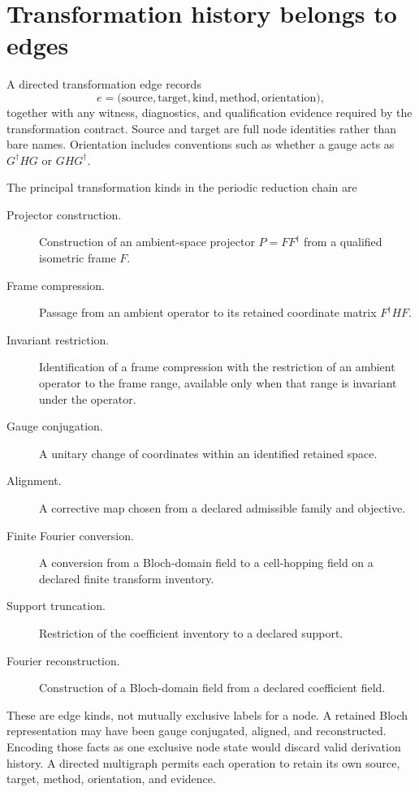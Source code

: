 \section{Transformation history belongs to edges}

A directed transformation edge records
\begin{equation}
  e=
  \bigl(
    \text{source},\text{target},\text{kind},
    \text{method},\text{orientation}
  \bigr),
  \label{eq:representation-carrier-edge-identity}
\end{equation}
together with any witness, diagnostics, and qualification evidence required by
the transformation contract. Source and target are full node identities rather
than bare names. Orientation includes conventions such as whether a gauge acts
as $G^\dagger H G$ or $G H G^\dagger$.

The principal transformation kinds in the periodic reduction chain are

\begin{description}
  \item[Projector construction.] Construction of an ambient-space projector
    $P=FF^\dagger$ from a qualified isometric frame $F$.
  \item[Frame compression.] Passage from an ambient operator to its retained
    coordinate matrix $F^\dagger H F$.
  \item[Invariant restriction.] Identification of a frame compression with the
    restriction of an ambient operator to the frame range, available only when
    that range is invariant under the operator.
  \item[Gauge conjugation.] A unitary change of coordinates within an identified
    retained space.
  \item[Alignment.] A corrective map chosen from a declared admissible family
    and objective.
  \item[Finite Fourier conversion.] A conversion from a Bloch-domain field to
    a cell-hopping field on a declared finite transform inventory.
  \item[Support truncation.] Restriction of the coefficient inventory to a
    declared support.
  \item[Fourier reconstruction.] Construction of a Bloch-domain field from a
    declared coefficient field.
\end{description}

These are edge kinds, not mutually exclusive labels for a node. A retained
Bloch representation may have been gauge conjugated, aligned, and reconstructed.
Encoding those facts as one exclusive node state would discard valid derivation
history. A directed multigraph permits each operation to retain its own source,
target, method, orientation, and evidence.

